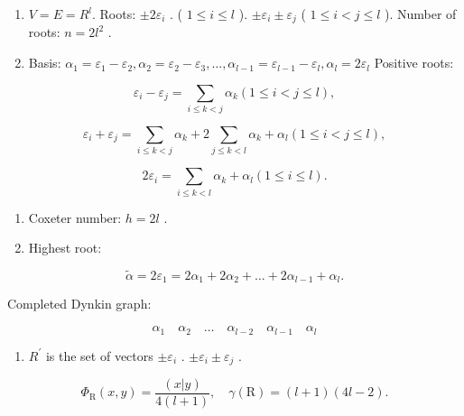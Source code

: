 
\begin{enumerate}
\def\labelenumi{(\Roman{enumi})}
\item
  \(V = E = R^{l}.\) Roots: \(\pm2\varepsilon_{i}\) . ( \(1\leqslant i\leqslant l\) ). \(\pm\varepsilon_{i}\pm\varepsilon_{j}\) ( \(1\leqslant i<j\leqslant l\) ). Number of roots: \(n = 2l^{2}\) .
\item
  Basis: \(\alpha_{1} = \varepsilon_{1} - \varepsilon_{2},\alpha_{2} = \varepsilon_{2} - \varepsilon_{3},\ldots ,\alpha_{l - 1} = \varepsilon_{l - 1} - \varepsilon_{l},\alpha_{l} = 2\varepsilon_{l}\) Positive roots:
\end{enumerate}

\[
\varepsilon_ {i} - \varepsilon_ {j} = \sum_ {i \leqslant k <   j} \alpha_ {k} (1 \leqslant i <   j \leqslant l),
\]

\[
\varepsilon_ {i} + \varepsilon_ {j} = \sum_ {i \leqslant k <   j} \alpha_ {k} + 2 \sum_ {j \leqslant k <   l} \alpha_ {k} + \alpha_ {l} (1 \leqslant i <   j \leqslant l),
\]

\[
2 \varepsilon_ {i} = \sum_ {i \leqslant k <   l} \alpha_ {k} + \alpha_ {l} (1 \leqslant i \leqslant l).
\]

\begin{enumerate}
\def\labelenumi{(\Roman{enumi})}
\setcounter{enumi}{2}
\item
  Coxeter number: \(h = 2l\) .
\item
  Highest root:
\end{enumerate}

\[
\tilde {\alpha} = 2 \varepsilon_ {1} = 2 \alpha_ {1} + 2 \alpha_ {2} + \dots + 2 \alpha_ {l - 1} + \alpha_ {l}.
\]

Completed Dynkin graph:

\[
\alpha_ {1} \quad \alpha_ {2} \quad \dots \quad \alpha_ {l - 2} \quad \alpha_ {l - 1} \quad \alpha_ {l}
\]

\begin{enumerate}
\def\labelenumi{(\Alph{enumi})}
\setcounter{enumi}{21}
\tightlist
\item
  \(R^{\prime}\) is the set of vectors \(\pm\varepsilon_{i}\) . \(\pm\varepsilon_{i}\pm\varepsilon_{j}\) .
\end{enumerate}

\[
\Phi_ {\mathrm{R}} (x, y) = \frac {(x | y)}{4 (l + 1)}, \quad \gamma (\mathrm{R}) = (l + 1) (4 l - 2).
\]

